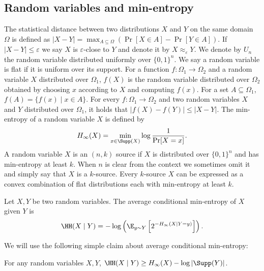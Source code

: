 \subsection*{Random variables and min-entropy}
The statistical distance between two distributions $X$ and $Y$ on the same domain $\Omega$ is defined as $|X-Y|=\max_{A\subseteq\Omega}(\Pr[X\in A]-\Pr[Y\in A])$. If $|X-Y|\le\varepsilon$ we say $X$ is $\varepsilon$-close to $Y$ and denote it by $X\approx_\varepsilon Y$. We denote by $U_n$ the random variable distributed uniformly over $\{0,1\}^n$. We say a random variable is flat if it is uniform over its support.
For a function $f:\Omega_1\to\Omega_2$ and a random variable $X$ distributed over $\Omega_1$, $f(X)$ is the random variable distributed over $\Omega_2$ obtained by choosing $x$ according to $X$ and computing $f(x)$. For a set $A\subseteq\Omega_1$, $f(A)=\{f(x)\mid x\in A\}$. For every $f:\Omega_1\to\Omega_2$ and two random variables $X$ and $Y$ distributed over $\Omega_1$, it holds that $|f(X)-f(Y)|\le|X-Y|$.
The min-entropy of a random variable $X$ is defined by
\[H_\infty(X)=\min_{x\in\Supp(X)}\log\frac1{\Pr[X=x]}.\]
A random variable $X$ is an $(n,k)$ source if $X$ is distributed over $\{0,1\}^n$ and has min-entropy at least $k$. When $n$ is clear from the context we sometimes omit it and simply say that $X$ is a $k$-source. Every $k$-source $X$ can be expressed as a convex combination of flat distributions each with min-entropy at least $k$.
\setcounter{theorem}{5}
\begin{definition}
Let $X,Y$ be two random variables. The average conditional min-entropy of $X$ given $Y$ is
\[\HH(X\mid Y)=-\log\left(\E_{y\sim Y}\left[2^{-H_\infty(X\mid Y=y)}\right]\right).\]
\end{definition}
We will use the following simple claim about average conditional min-entropy:
\begin{claim}For any random variables $X,Y$, $\HH(X\mid Y)\ge H_\infty(X)-\log|\Supp(Y)|$.\end{claim}
